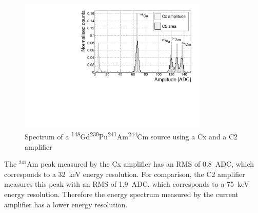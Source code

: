\begin{figure}[!t]
\centering
\includegraphics[width=0.8\textwidth]{../scripts/05_current_monitoring/plot4alpha/plots/4alphaCompare}
\caption{Spectrum of a \textsuperscript{148}Gd\textsuperscript{239}Pu\textsuperscript{241}Am\textsuperscript{244}Cm source using a Cx and a C2 amplifier}
\label{fig:c2cx4alpha}
\end{figure}
The $^{241}$Am peak measured by the Cx amplifier has an RMS of 0.8~ADC, which corresponds to a 32~keV energy resolution. For comparison, the C2 amplifier measures this peak with an RMS of 1.9~ADC, which corresponds to a 75~keV energy resolution. Therefore the energy spectrum measured by the current amplifier has a lower energy resolution.









\clearpage
